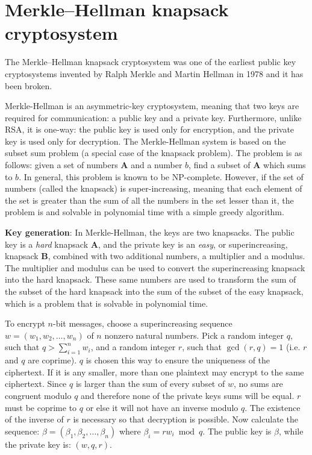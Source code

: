 \chapter{Merkle–Hellman knapsack cryptosystem}
The Merkle–Hellman knapsack cryptosystem was one of the earliest public key cryptosystems invented by Ralph Merkle and Martin Hellman in 1978 and it has been broken.

Merkle-Hellman is an asymmetric-key cryptosystem, meaning that two keys are required for communication: a public key and a private key. Furthermore, unlike RSA, it is one-way: the public key is used only for encryption, and the private key is used only for decryption. The Merkle-Hellman system is based on the subset sum problem (a special case of the knapsack problem). The problem is as follows: given a set of numbers $\textbf{A}$ and a number $b$, find a subset of $\textbf{A}$ which sums to $b$. In general, this problem is known to be NP-complete. However, if the set of numbers (called the knapsack) is super-increasing, meaning that each element of the set is greater than the sum of all the numbers in the set lesser than it, the problem is  and solvable in polynomial time with a simple greedy algorithm.



\textbf{Key generation}: In Merkle-Hellman, the keys are two knapsacks. The public key is a \textit{hard} knapsack $\textbf{A}$, and the private key is an \textit{easy}, or superincreasing, knapsack $\textbf{B}$, combined with two additional numbers, a multiplier and a modulus. The multiplier and modulus can be used to convert the superincreasing knapsack into the hard knapsack. These same numbers are used to transform the sum of the subset of the hard knapsack into the sum of the subset of the easy knapsack, which is a problem that is solvable in polynomial time.

To encrypt $n$-bit messages, choose a superincreasing sequence
$w = (w_1, w_2, \dots, w_n)$ of $n$ nonzero natural numbers. Pick a random integer $q$, such that $q>\sum _{i=1}^{n}w_{i}$,
and a random integer $r$, such that $\gcd(r,q) = 1$ (i.e. $r$ and $q$ are coprime). $q$ is chosen this way to ensure the uniqueness of the ciphertext. If it is any smaller, more than one plaintext may encrypt to the same ciphertext. Since $q$ is larger than the sum of every subset of $w$, no sums are congruent modulo $q$ and therefore none of the private keys sums will be equal. $r$ must be coprime to $q$ or else it will not have an inverse modulo $q$. The existence of the inverse of $r$ is necessary so that decryption is possible. Now calculate the sequence: $\beta = (\beta_1, \beta_2, \dots, \beta_n)$ where $\beta_i = rw_i \bmod q$. The public key is $\beta$, while the private key is: $(w, q, r)$.


